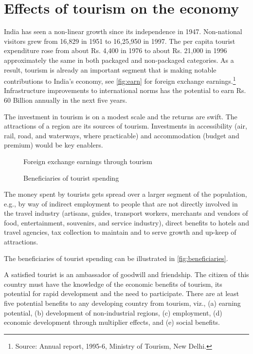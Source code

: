 \section{Effects of tourism on the economy} %
\label{sec:etoe}

India has seen a non-linear growth since its independence in 1947. Non-national visitors grew from 16,829 in 1951 to 16,25,950 in 1997. The per capita tourist expenditure rose from about Rs. 4,400 in 1976 to about Rs. 21,000 in 1996 approximately the same in both packaged and non-packaged categories. As a result, tourism is already an important segment that is making notable contributions to India's economy, see \autoref{fig:earn} for foreign exchange earnings.\footnote{Source: Annual report, 1995-6, Ministry of Tourism, New Delhi.} Infrastructure improvements to international norms has the potential to earn Rs. 60 Billion annually in the next five years.

The investment in tourism is on a modest scale and the returns are swift. The attractions of a region are its sources of tourism. Investments in accessibility (air, rail, road, and waterways, where practicable) and accommodation (budget and premium) would be key enablers.

\begin{figure}[H]
  \centering
  
  \caption{Foreign exchange earnings through tourism}
  \label{fig:earn}
\end{figure}

\begin{figure}[H]
  \centering
  \small
  
  \caption{Beneficiaries of tourist spending}
  \label{fig:beneficiaries} 
\end{figure}

The money spent by tourists gets spread over a larger segment of the population, e.g., by way of indirect employment to people that are not directly involved in the travel industry (artisans, guides, transport workers, merchants and vendors of food, entertainment, souvenirs, and service industry), direct benefits to hotels and travel agencies, tax collection to maintain and to serve growth and up-keep of attractions.

The beneficiaries of tourist spending can be illustrated in \autoref{fig:beneficiaries}.

A satisfied tourist is an ambassador of goodwill and friendship. The citizen of this country must have the knowledge of the economic benefits of tourism, its potential for rapid development and the need to participate. There are at least five potential benefits to any developing country from tourism, viz., (a) earning potential, (b) development of non-industrial regions, (c) employment, (d) economic development through multiplier effects, and (e) social benefits. 

